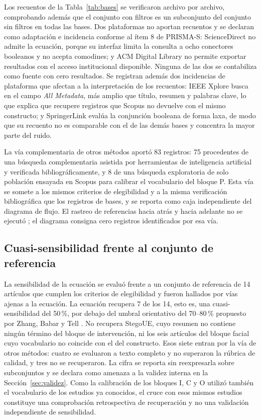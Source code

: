 \documentclass[pdflatex,sn-mathphys-num]{sn-jnl}
\theoremstyle{thmstyleone}
\theoremstyle{thmstyletwo}
\theoremstyle{thmstylethree}
\begin{document}
Los recuentos de la Tabla~\ref{tab:bases} se verificaron archivo por archivo, comprobando además que el conjunto con filtros es un subconjunto del conjunto sin filtros en todas las bases. Dos plataformas no aportan recuentos y se declaran como adaptación e incidencia conforme al ítem 8 de PRISMA-S: ScienceDirect no admite la ecuación, porque su interfaz limita la consulta a ocho conectores booleanos y no acepta comodines; y ACM Digital Library no permite exportar resultados con el acceso institucional disponible. Ninguna de las dos se contabiliza como fuente con cero resultados. Se registran además dos incidencias de plataforma que afectan a la interpretación de los recuentos: IEEE Xplore busca en el campo \emph{All Metadata}, más amplio que título, resumen y palabras clave, lo que explica que recupere registros que Scopus no devuelve con el mismo constructo; y SpringerLink evalúa la conjunción booleana de forma laxa, de modo que su recuento no es comparable con el de las demás bases y concentra la mayor parte del ruido.

La vía complementaria de otros métodos aportó 83 registros: 75 procedentes de una búsqueda complementaria asistida por herramientas de inteligencia artificial y verificada bibliográficamente, y 8 de una búsqueda exploratoria de solo población ensayada en Scopus para calibrar el vocabulario del bloque P. Esta vía se somete a los mismos criterios de elegibilidad y a la misma verificación bibliográfica que los registros de bases, y se reporta como caja independiente del diagrama de flujo. El rastreo de referencias hacia atrás y hacia adelante no se ejecutó \cite{wohlin2014guidelines}; el diagrama consigna cero registros identificados por esa vía.

\subsection{Cuasi-sensibilidad frente al conjunto de referencia}\label{sec:qgs}

La sensibilidad de la ecuación se evaluó frente a un conjunto de referencia de 14 artículos que cumplen los criterios de elegibilidad y fueron hallados por vías ajenas a la ecuación. La ecuación recupera 7 de los 14, esto es, una cuasi-sensibilidad del 50\,\%, por debajo del umbral orientativo del 70--80\,\% propuesto por Zhang, Babar y Tell \cite{zhang2011identifying}. No recupera StegoUE, cuyo resumen no contiene ningún término del bloque de intervención, ni los seis artículos del bloque facial cuyo vocabulario no coincide con el del constructo. Esos siete entran por la vía de otros métodos: cuatro se evaluaron a texto completo y no superaron la rúbrica de calidad, y tres no se recuperaron. La cifra se reporta sin reexpresarla sobre subconjuntos y se declara como amenaza a la validez interna en la Sección~\ref{sec:validez}. Como la calibración de los bloques I, C y O utilizó también el vocabulario de los estudios ya conocidos, el cruce con esos mismos estudios constituye una comprobación retrospectiva de recuperación y no una validación independiente de sensibilidad.
\end{document}
